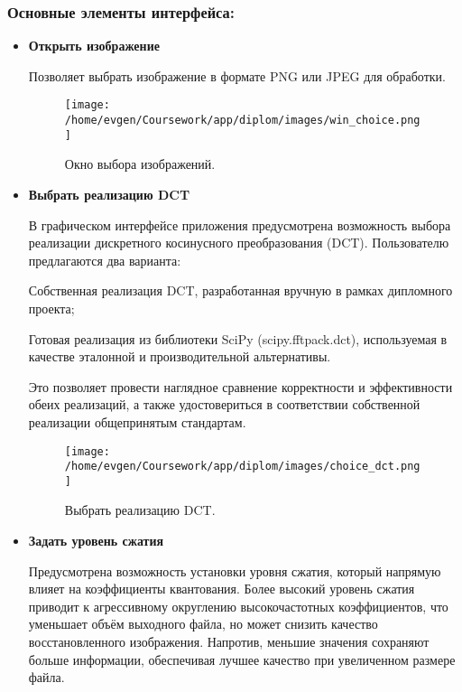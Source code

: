 \subsubsection{Основные элементы интерфейса:}

\begin{itemize}
    \item \textbf{Открыть изображение}

    Позволяет выбрать изображение в формате PNG или JPEG для обработки.
    
    \begin{figure}[h!]
        \centering
        \texttt{[image: /home/evgen/Coursework/app/diplom/images/win\_choice.png]}
        \caption{Окно выбора изображений.}
        \label{fig:win_choice}
    \end{figure}



    \item \textbf{Выбрать реализацию DCT}

    В графическом интерфейсе приложения предусмотрена возможность выбора реализации дискретного косинусного преобразования (DCT). 
    Пользователю предлагаются два варианта:

    Собственная реализация DCT, разработанная вручную в рамках дипломного проекта;
    
    Готовая реализация из библиотеки SciPy (scipy.fftpack.dct), используемая в качестве эталонной и производительной альтернативы.
    
    Это позволяет провести наглядное сравнение корректности и эффективности обеих реализаций, а также удостовериться в соответствии собственной реализации общепринятым стандартам.

    \begin{figure}[h!]
        \centering
        \texttt{[image: /home/evgen/Coursework/app/diplom/images/choice\_dct.png]}
        \caption{Выбрать реализацию DCT.}
        \label{fig:choice_dct}
    \end{figure}



    \item \textbf{Задать уровень сжатия}
    
    Предусмотрена возможность установки уровня сжатия, который напрямую влияет на коэффициенты квантования. 
    Более высокий уровень сжатия приводит к агрессивному округлению высокочастотных коэффициентов, 
    что уменьшает объём выходного файла, но может снизить качество восстановленного изображения. 
    Напротив, меньшие значения сохраняют больше информации, обеспечивая лучшее качество при увеличенном размере файла.


\end{itemize}
